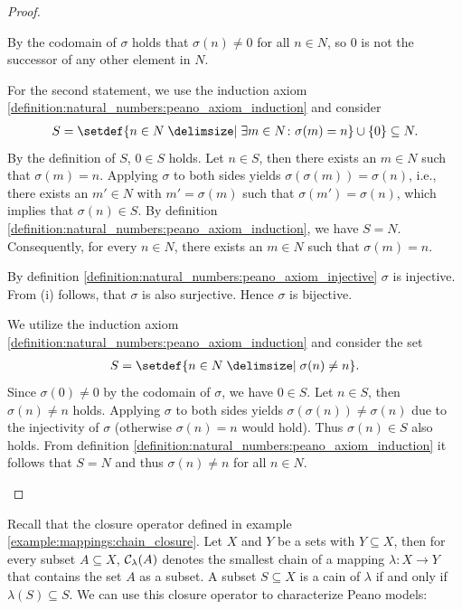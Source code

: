 \begin{proof}
    \begin{proofenumerate}
        \item By the codomain of $\sigma$ holds that $\sigma(n)\neq 0$ for all $n\in N$, so $0$ is not the successor of any other element in $N$.
        
        For the second statement, we use the induction axiom \ref{definition:natural_numbers:peano_axiom_induction} and consider
        \begin{align}S=\setdef{n\in N\given \exists m\in N\colon \sigma(m)=n}\cup\{0\}\subseteq N.\end{align}
        By the definition of $S$, $0\in S$ holds.
        Let $n\in S$, then there exists an $m\in N$ such that $\sigma(m)=n$.
        Applying $\sigma$ to both sides yields $\sigma(\sigma(m))=\sigma(n)$, i.e., there exists an $m'\in N$ with $m'=\sigma(m)$ such that $\sigma(m')=\sigma(n)$, which implies that $\sigma(n)\in S$.
        By definition \ref{definition:natural_numbers:peano_axiom_induction}, we have $S=N$. Consequently, for every $n\in N$, there exists an $m\in N$ such that $\sigma(m)=n$.

        \item By definition \ref{definition:natural_numbers:peano_axiom_injective} $\sigma$ is injective. From (i) follows, that $\sigma$ is also surjective. Hence $\sigma$ is bijective.
        
        \item We utilize the induction axiom \ref{definition:natural_numbers:peano_axiom_induction} and consider the set
        \begin{align}S=\setdef{n\in N\given \sigma(n)\neq n}.\end{align}
        Since $\sigma(0)\neq 0$ by the codomain of $\sigma$, we have $0\in S$. Let $n\in S$, then $\sigma(n)\neq n$ holds. Applying $\sigma$ to both sides yields $\sigma(\sigma(n))\neq \sigma(n)$ due to the injectivity of $\sigma$ (otherwise $\sigma(n)=n$ would hold).
        Thus $\sigma(n)\in S$ also holds. From definition \ref{definition:natural_numbers:peano_axiom_induction} it follows that $S=N$ and thus $\sigma(n)\neq n$ for all $n\in N$.
    \end{proofenumerate}
\end{proof}

Recall that the closure operator defined in example \ref{example:mappings:chain_closure}. Let $X$ and $Y$ be a sets with $Y\subseteq X$, then for every subset $A\subseteq X$, $\mathcal C_\lambda(A)$ denotes the smallest chain of a mapping $\lambda\colon X\to Y$ that contains the set $A$ as a subset. A subset $S\subseteq X$ is a cain of $\lambda$ if and only if $\lambda(S)\subseteq S$. We can use this closure operator to characterize Peano models:

